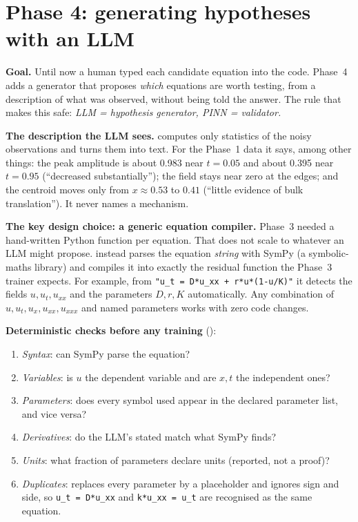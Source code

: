\section{Phase 4: generating hypotheses with an LLM}\label{sec:p4}

\textbf{Goal.} Until now a human typed each candidate equation into the code. Phase~4 adds a generator that
proposes \emph{which} equations are worth testing, from a description of what was observed, without being told
the answer. The rule that makes this safe: \emph{LLM = hypothesis generator, PINN = validator.}

\textbf{The description the LLM sees.}  computes only statistics of the noisy
observations and turns them into text. For the Phase~1 data it says, among other things: the peak amplitude is
about 0.983 near $t=0.05$ and about 0.395 near $t=0.95$ (``decreased substantially''); the field stays near
zero at the edges; and the centroid moves only from $x\approx0.53$ to $0.41$ (``little evidence of bulk
translation''). It never names a mechanism.

\textbf{The key design choice: a generic equation compiler.} Phase~3 needed a hand-written Python function per
equation. That does not scale to whatever an LLM might propose.  instead parses the
equation \emph{string} with SymPy (a symbolic-maths library) and compiles it into exactly the residual function
the Phase~3 trainer expects. For example, from \texttt{"u\_t = D*u\_xx + r*u*(1-u/K)"} it detects the fields
$u, u_t, u_{xx}$ and the parameters $D, r, K$ automatically. Any combination of $u, u_t, u_x, u_{xx}, u_{xxx}$
and named parameters works with zero code changes.

\textbf{Deterministic checks before any training} ():
\begin{enumerate}
  \item \emph{Syntax}: can SymPy parse the equation?
  \item \emph{Variables}: is $u$ the dependent variable and are $x, t$ the independent ones?
  \item \emph{Parameters}: does every symbol used appear in the declared parameter list, and vice versa?
  \item \emph{Derivatives}: do the LLM's stated  match what SymPy finds?
  \item \emph{Units}: what fraction of parameters declare units (reported, not a proof)?
  \item \emph{Duplicates}:  replaces every parameter by a placeholder and ignores sign
        and side, so \texttt{u\_t = D*u\_xx} and \texttt{k*u\_xx = u\_t} are recognised as the same equation.
\end{enumerate}

